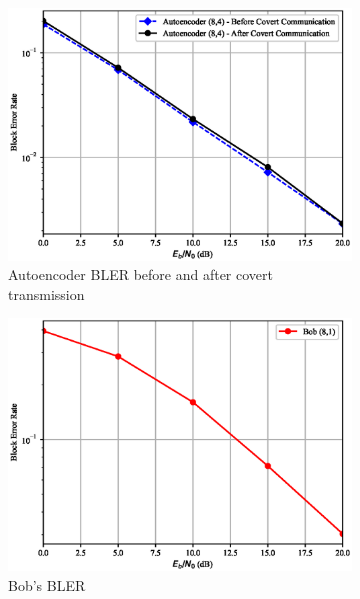 \begin{figure}[th!] \label{fig:rayleigh_resutls}
	\begin{subfigure}{0.3\textwidth}
		\includegraphics[width=\linewidth]{figs/covert_autoencoder_bler_rayleigh}
		\caption{Autoencoder BLER before and after covert transmission}
	\end{subfigure}
	\hspace*{\fill}
	\begin{subfigure}{0.3\textwidth}
		\includegraphics[width=\linewidth]{figs/bob_bler_rayleigh}
		\caption{Bob's BLER}	
	\end{subfigure}
	\hspace*{\fill}
	\begin{subfigure}{0.3\textwidth}

\end{subfigure}
\end{figure}

